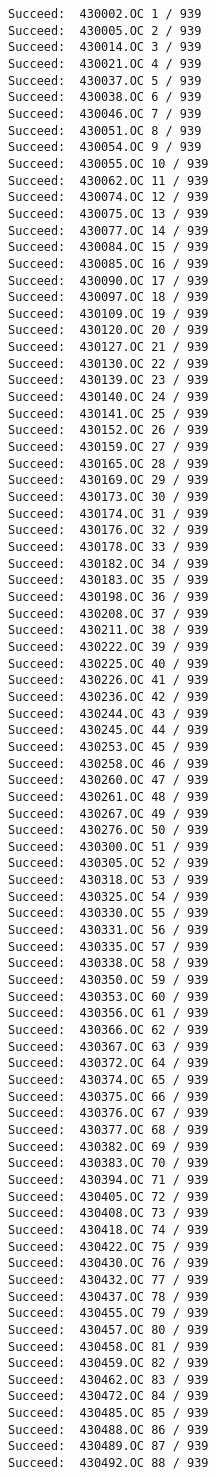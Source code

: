 \documentclass[11pt]{article}
\begin{document}
\begin{verbatim}
Succeed:  430002.OC 1 / 939
Succeed:  430005.OC 2 / 939
Succeed:  430014.OC 3 / 939
Succeed:  430021.OC 4 / 939
Succeed:  430037.OC 5 / 939
Succeed:  430038.OC 6 / 939
Succeed:  430046.OC 7 / 939
Succeed:  430051.OC 8 / 939
Succeed:  430054.OC 9 / 939
Succeed:  430055.OC 10 / 939
Succeed:  430062.OC 11 / 939
Succeed:  430074.OC 12 / 939
Succeed:  430075.OC 13 / 939
Succeed:  430077.OC 14 / 939
Succeed:  430084.OC 15 / 939
Succeed:  430085.OC 16 / 939
Succeed:  430090.OC 17 / 939
Succeed:  430097.OC 18 / 939
Succeed:  430109.OC 19 / 939
Succeed:  430120.OC 20 / 939
Succeed:  430127.OC 21 / 939
Succeed:  430130.OC 22 / 939
Succeed:  430139.OC 23 / 939
Succeed:  430140.OC 24 / 939
Succeed:  430141.OC 25 / 939
Succeed:  430152.OC 26 / 939
Succeed:  430159.OC 27 / 939
Succeed:  430165.OC 28 / 939
Succeed:  430169.OC 29 / 939
Succeed:  430173.OC 30 / 939
Succeed:  430174.OC 31 / 939
Succeed:  430176.OC 32 / 939
Succeed:  430178.OC 33 / 939
Succeed:  430182.OC 34 / 939
Succeed:  430183.OC 35 / 939
Succeed:  430198.OC 36 / 939
Succeed:  430208.OC 37 / 939
Succeed:  430211.OC 38 / 939
Succeed:  430222.OC 39 / 939
Succeed:  430225.OC 40 / 939
Succeed:  430226.OC 41 / 939
Succeed:  430236.OC 42 / 939
Succeed:  430244.OC 43 / 939
Succeed:  430245.OC 44 / 939
Succeed:  430253.OC 45 / 939
Succeed:  430258.OC 46 / 939
Succeed:  430260.OC 47 / 939
Succeed:  430261.OC 48 / 939
Succeed:  430267.OC 49 / 939
Succeed:  430276.OC 50 / 939
Succeed:  430300.OC 51 / 939
Succeed:  430305.OC 52 / 939
Succeed:  430318.OC 53 / 939
Succeed:  430325.OC 54 / 939
Succeed:  430330.OC 55 / 939
Succeed:  430331.OC 56 / 939
Succeed:  430335.OC 57 / 939
Succeed:  430338.OC 58 / 939
Succeed:  430350.OC 59 / 939
Succeed:  430353.OC 60 / 939
Succeed:  430356.OC 61 / 939
Succeed:  430366.OC 62 / 939
Succeed:  430367.OC 63 / 939
Succeed:  430372.OC 64 / 939
Succeed:  430374.OC 65 / 939
Succeed:  430375.OC 66 / 939
Succeed:  430376.OC 67 / 939
Succeed:  430377.OC 68 / 939
Succeed:  430382.OC 69 / 939
Succeed:  430383.OC 70 / 939
Succeed:  430394.OC 71 / 939
Succeed:  430405.OC 72 / 939
Succeed:  430408.OC 73 / 939
Succeed:  430418.OC 74 / 939
Succeed:  430422.OC 75 / 939
Succeed:  430430.OC 76 / 939
Succeed:  430432.OC 77 / 939
Succeed:  430437.OC 78 / 939
Succeed:  430455.OC 79 / 939
Succeed:  430457.OC 80 / 939
Succeed:  430458.OC 81 / 939
Succeed:  430459.OC 82 / 939
Succeed:  430462.OC 83 / 939
Succeed:  430472.OC 84 / 939
Succeed:  430485.OC 85 / 939
Succeed:  430488.OC 86 / 939
Succeed:  430489.OC 87 / 939
Succeed:  430492.OC 88 / 939

\end{verbatim}
\end{document}
